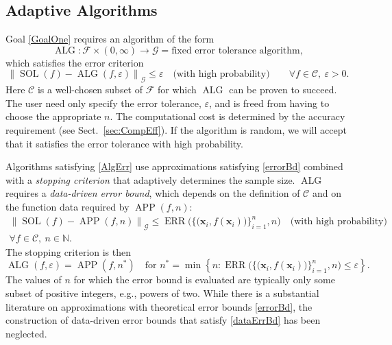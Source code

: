 \documentclass[11pt]{NSFamsart}
\newcommand{\naturals}{{\mathbb{N}}}
\DeclareMathOperator{\SOL}{SOL}
\DeclareMathOperator{\APP}{APP}
\DeclareMathOperator{\ALG}{ALG}
\DeclareMathOperator{\ERR}{ERR}
\newcommand{\bx}{{\boldsymbol{x}}}
\newcommand{\cc}{\mathcal{C}}
\newcommand{\calc}{{\mathcal{C}}}
\newcommand{\calf}{{\mathcal{F}}}
\newcommand{\calg}{{\mathcal{G}}}
\newcommand{\norm}[2][{}]{\ensuremath{\left \lVert #2 \right \rVert}_{#1}}
\newcommand{\dataN}{\bigl\{\bigl(\bx_i,f(\bx_i)\bigr)\bigr\}_{i=1}^n}
\newcommand{\ErrN}{\ERR\bigl(\dataN,n\bigr)}
\begin{document}
\subsection{Adaptive Algorithms} \label{sec:AdapAlgo}

Goal \ref{GoalOne} requires an algorithm of the form
\begin{equation*}
    \ALG : \calf \times (0,\infty) \to \calg = \text{fixed error tolerance algorithm},
\end{equation*}
which satisfies the error criterion
\begin{equation}
      \tag{ALG-CRIT} \label{AlgErr}
    \norm[\calg]{\SOL(f) - \ALG(f,\varepsilon)} \le \varepsilon \quad \text{(with high probability)} \qquad \forall f\in \calc, \ \varepsilon >0.
\end{equation}
Here $\calc$ is a well-chosen subset of $\calf$ for which $\ALG$ can be proven to succeed.  The user need only specify the error tolerance, $\varepsilon$, and is freed from having to choose the appropriate $n$.  The computational cost is determined by the accuracy requirement (see Sect.\ \ref{sec:CompEff}).  If the algorithm is random, we will accept that it satisfies the error tolerance with high probability.  

Algorithms satisfying \eqref{AlgErr} use approximations satisfying \eqref{errorBd} combined with a \emph{stopping criterion} that adaptively determines the sample size.  $\ALG$ requires a \emph{data-driven error bound}, which depends on the definition of $\calc$ and on the function data required by $\APP(f,n)$:
\begin{multline} \label{dataErrBd} \tag{DATA-BD}
\norm[\calg]{\SOL(f) - \APP(f,n)} \le \ErrN \quad \text{(with high probability)} \\ \forall f \in \cc, \ n \in \naturals.
\end{multline}
The stopping criterion is then
\begin{equation} \label{stopCrit} \tag{STOP}
\ALG(f,\varepsilon) = \APP(f,n^*) \quad \text{for } n^* = \min \left \{ n : \ErrN \le \varepsilon \right \}.
\end{equation}
The values of $n$ for which the error bound is evaluated are typically only some subset of positive integers, e.g., powers of two.  While there is a substantial literature on approximations with theoretical error bounds \eqref{errorBd}, the construction of data-driven error bounds that satisfy \eqref{dataErrBd} has been neglected. 
\end{document}
